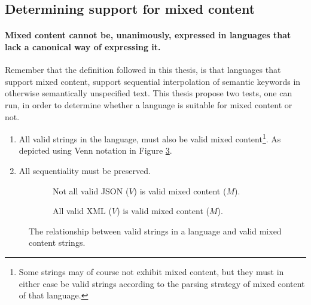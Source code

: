 \documentclass{scrreprt}
\begin{document}
\subsection{Determining support for mixed content}
\paragraph{Mixed content cannot be, unanimously, expressed in languages that lack a canonical way of expressing it.} Remember that the definition followed in this thesis, is that languages that support mixed content, support sequential interpolation of semantic keywords in otherwise semantically unspecified text. This thesis propose two tests, one can run, in order to determine whether a language is suitable for mixed content or not.

\begin{enumerate}
\item All valid strings in the language, must also be valid mixed content\footnote{Some strings may of course not exhibit mixed content, but they must in either case be valid strings according to the parsing strategy of mixed content of that language.}. As depicted using Venn notation in Figure \ref{fig:mixed-content-venn}.
\item All sequentiality must be preserved.
\end{enumerate}


\begin{figure}[h]
\centering
\begin{subfigure}{.4\textwidth}
  \centering

  \caption{Not all valid JSON ($V$) is valid mixed content ($M$).}
  \label{fig:mixed-content-venn-json}
  
\end{subfigure}%
\begin{subfigure}{.4\textwidth}
  \centering

  \caption{All valid XML ($V$) is valid mixed content ($M$).}
  \label{fig:mixed-content-venn-json}
  
\end{subfigure}
\caption{The relationship between valid strings in a language and valid mixed content strings.}
\label{fig:mixed-content-venn}
\end{figure}
\end{document}
